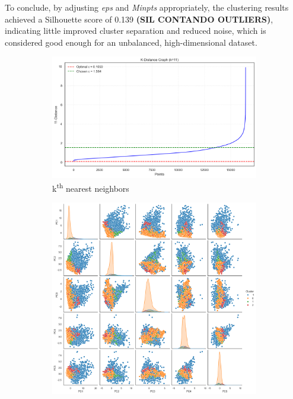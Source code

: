 To conclude, by adjusting \textit{eps} and \textit{Minpts} appropriately, the clustering results achieved a Silhouette score of 0.139 \textbf{(SIL CONTANDO OUTLIERS)}, indicating little improved cluster separation and reduced noise, which is considered good enough for an unbalanced, high-dimensional dataset.

\begin{figure}[H]
    \centering
    \begin{subfigure}[b]{0.49\textwidth}
        \centering
        \includegraphics[width=\textwidth]{plots/DBSCAN_kth_graph.png}
        \caption{k\textsuperscript{th} nearest neighbors}
        \label{fig:DBSCAN_kth_graph}
    \end{subfigure}
    \begin{subfigure}[b]{0.49\textwidth}
        \centering
        \includegraphics[width=\textwidth]{plots/DBSCAN_provvisoria.png}

\end{subfigure}
\end{figure}
